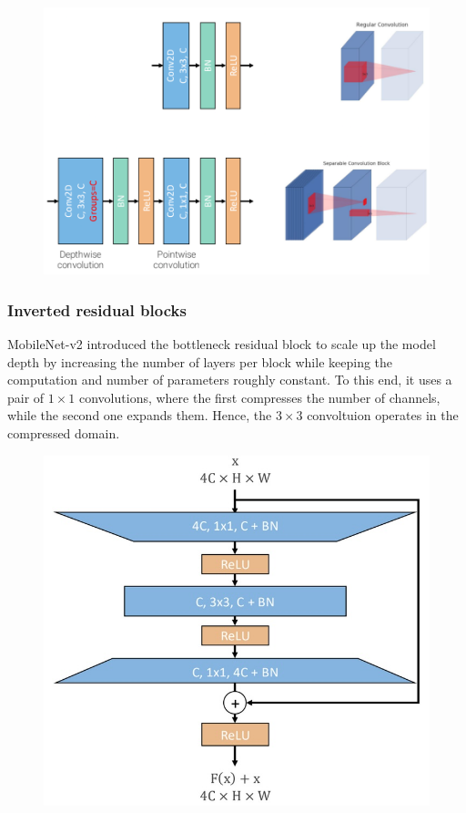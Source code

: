 \documentclass{article}
\begin{document}
\begin{figure}[htbp]
  \centering
  \includegraphics[width=0.8\linewidth]{./img/separable_convolution.png}
\end{figure}

\subsubsection{Inverted residual blocks}
MobileNet-v2 introduced the bottleneck residual block to scale up the model depth by increasing the number of layers per block while keeping the computation and number of parameters roughly constant.
To this end, it uses a pair of $1\times 1$ convolutions, where the first compresses the number of channels, while the second one expands them.
Hence, the $3\times 3$ convoltuion operates in the compressed domain.

\begin{figure}[htbp]
  \centering
  \includegraphics[width=0.8\linewidth]{./img/bottleneck_residual.jpg}
\end{figure}
\end{document}
